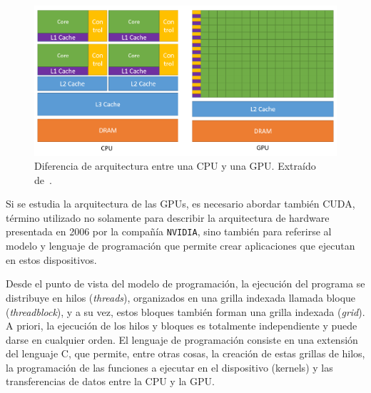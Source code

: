 \begin{figure}
    \centering
    \includegraphics[width=\textwidth]{imagenes/chapter2/cpuvsgpu.PNG}
    \caption{Diferencia de arquitectura entre una CPU y una GPU. Extraído de~\cite{cuda-programming-guide}.}
    \label{fig:cpuvsgpu}
\end{figure}


Si se estudia la arquitectura de las GPUs, es necesario abordar también CUDA, %
término utilizado no solamente para describir la arquitectura de hardware presentada en 2006 por la compañía \texttt{NVIDIA}, sino también para referirse al modelo y lenguaje de programación que permite crear aplicaciones que ejecutan en estos dispositivos. 

Desde el punto de vista del modelo de programación, la ejecución del programa se distribuye en hilos (\textit{threads}), organizados en una grilla indexada llamada bloque (\textit{threadblock}), y a su vez, estos bloques también forman una grilla indexada (\textit{grid}). A priori, la ejecución de los hilos y bloques es totalmente independiente y puede darse en cualquier orden. El lenguaje de programación consiste en una extensión del lenguaje C, que permite, entre otras cosas, la creación de estas grillas de hilos, la programación de las funciones a ejecutar en el dispositivo (kernels) y las transferencias de datos entre la CPU y la GPU.

